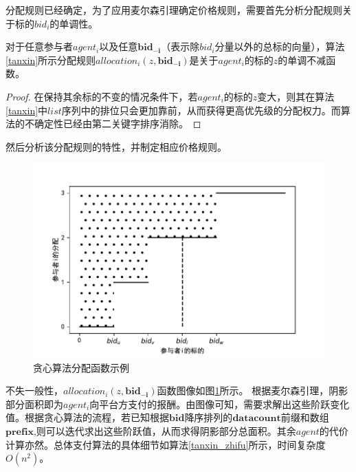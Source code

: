 \documentclass[promaster]{thesis-uestc}
\begin{document}
分配规则已经确定，为了应用麦尔森引理确定价格规则，需要首先分析分配规则关于标的$bid_i$的单调性。

\begin{theorem}
    对于任意参与者$agent_i$以及任意$\mathbf{bid_{-i}}$（表示除$bid_i$分量以外的总标的向量），算法\ref{tanxin}所示分配规则$allocation_i(z,\mathbf{bid_{-i}})$是关于$agent_i$的标的$z$的单调不减函数。
\end{theorem}

\begin{proof}
   在保持其余标的不变的情况条件下，若$agent_i$的标的$z$变大，则其在算法\ref{tanxin}中$list$序列中的排位只会更加靠前，从而获得更高优先级的分配权力。而算法的不确定性已经由第二关键字排序消除。
\end{proof}

然后分析该分配规则的特性，并制定相应价格规则。

\begin{figure}[H]
    \includegraphics[width=350pt]{pic/tanxin_allocation.pdf}
    \caption{贪心算法分配函数示例}
    \label{tanxin_allocation}
\end{figure}

不失一般性，$allocation_i(z,\mathbf{bid_{-i}})$函数图像如图\ref{tanxin_allocation}所示。
根据麦尔森引理，阴影部分面积即为$agent_i$向平台方支付的报酬。由图像可知，需要求解出这些阶跃变化值。根据贪心算法的流程，若已知根据$\mathbf{bid}$降序排列的$\mathbf{datacount}$前缀和数组$\mathbf{prefix}$,则可以迭代求出这些阶跃值，从而求得阴影部分总面积。其余$agent$的代价计算亦然。总体支付算法的具体细节如算法\ref{tanxin_zhifu}所示，时间复杂度$O(n^2)$。
\end{document}

